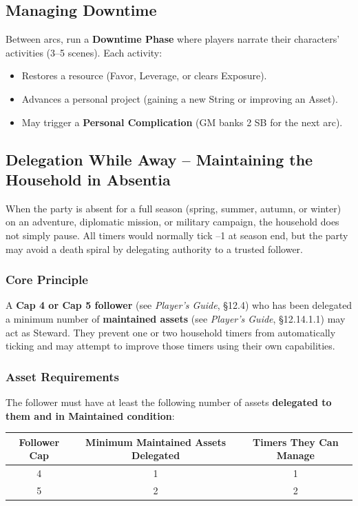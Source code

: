 \documentclass[11pt]{article}
\begin{document}
\subsection*{Managing Downtime}
Between arcs, run a \textbf{Downtime Phase} where players narrate their characters' activities (3--5 scenes). Each activity:
\begin{itemize}
  \item Restores a resource (Favor, Leverage, or clears Exposure).
  \item Advances a personal project (gaining a new String or improving an Asset).
  \item May trigger a \textbf{Personal Complication} (GM banks 2 SB for the next arc).
\end{itemize}

\subsection*{Delegation While Away -- Maintaining the Household in Absentia}
\label{subsec:delegation-away}

When the party is absent for a full season (spring, summer, autumn, or winter) on an adventure, diplomatic mission, or military campaign, the household does not simply pause. All timers would normally tick --1 at season end, but the party may avoid a death spiral by delegating authority to a trusted follower.

\subsubsection*{Core Principle}
A \textbf{Cap 4 or Cap 5 follower} (see \textit{Player's Guide}, §12.4) who has been delegated a minimum number of \textbf{maintained assets} (see \textit{Player's Guide}, §12.14.1.1) may act as Steward. They prevent one or two household timers from automatically ticking and may attempt to improve those timers using their own capabilities.

\subsubsection*{Asset Requirements}
The follower must have at least the following number of assets \textbf{delegated to them and in Maintained condition}:

\begin{center}
\begin{tabular}{|c|c|c|}
\hline
\textbf{Follower Cap} & \textbf{Minimum Maintained Assets Delegated} & \textbf{Timers They Can Manage} \\
\hline
4 & 1 & 1 \\
5 & 2 & 2 \\
\hline
\end{tabular}
\end{center}
\end{document}

